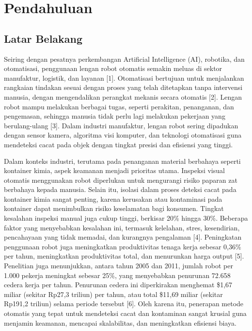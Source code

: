 \chapter{Pendahuluan}
\section{Latar Belakang}
Seiring dengan pesatnya perkembangan Artificial Intelligence (AI),
robotika, dan otomatisasi, penggunaan lengan robot otomatis semakin
meluas di sektor manufaktur, logistik, dan layanan [1]. Otomatisasi
bertujuan untuk menjalankan rangkaian tindakan sesuai dengan proses
yang telah ditetapkan tanpa intervensi manusia, dengan mengendalikan
perangkat mekanis secara otomatis [2]. Lengan robot mampu melakukan
berbagai tugas, seperti perakitan, penanganan, dan pengemasan,
sehingga manusia tidak perlu lagi melakukan pekerjaan yang
berulang-ulang [3]. Dalam industri manufaktur, lengan robot sering
dipadukan dengan sensor kamera, algoritma visi komputer, dan
teknologi otomatisasi guna mendeteksi cacat pada objek dengan tingkat
presisi dan efisiensi yang tinggi. \par

Dalam konteks industri, terutama pada penanganan material berbahaya
seperti kontainer kimia, aspek keamanan menjadi prioritas utama.
Inspeksi visual otomatis menggunakan robot diperlukan untuk
mengurangi risiko paparan zat berbahaya kepada manusia. Selain itu,
isolasi dalam proses deteksi cacat pada kontainer kimia sangat
penting, karena kerusakan atau kontaminasi pada kontainer dapat
menimbulkan risiko keselamatan bagi konsumen. Tingkat kesalahan
inspeksi manual juga cukup tinggi, berkisar 20\% hingga 30\%.
Beberapa faktor yang menyebabkan kesalahan ini, termasuk kelelahan,
stres, kesendirian, pencahayaan yang tidak memadai, dan kurangnya
pengalaman [4]. Peningkatan penggunaan robot juga meningkatkan
produktivitas tenaga kerja sebesar 0,36\% per tahun, meningkatkan
produktivitas total, dan menurunkan harga output [5]. Penelitian juga
menunjukkan, antara tahun 2005 dan 2011, jumlah robot per 1.000
pekerja meningkat sebesar 25\%, yang menyebabkan penurunan 72.658
cedera kerja per tahun. Penurunan cedera ini diperkirakan menghemat
\$1,67 miliar (sekitar Rp27,3 triliun) per tahun, atau total \$11,69
miliar (sekitar Rp191,2 triliun) selama periode tersebut [6]. Oleh
karena itu, penerapan metode otomatis yang tepat untuk mendeteksi
cacat dan kontaminan sangat krusial guna menjamin keamanan, mencapai
skalabilitas, dan meningkatkan efisiensi biaya.

